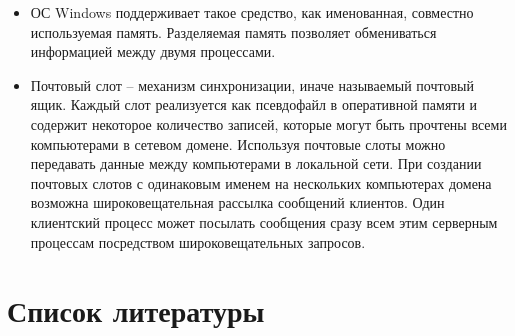 \documentclass[14pt,a4paper,report]{report}
\begin{document}
\begin{itemize}
	\item ОС Windows поддерживает такое средство, как именованная, совместно используемая память. Разделяемая память позволяет обмениваться информацией между двумя процессами.
	
	\item Почтовый слот – механизм синхронизации, иначе называемый почтовый ящик. Каждый слот реализуется как псевдофайл в оперативной памяти и содержит некоторое количество записей, которые могут быть прочтены всеми компьютерами в сетевом домене. Используя почтовые слоты можно передавать данные между компьютерами в локальной сети. При создании почтовых слотов с одинаковым именем на нескольких компьютерах домена возможна широковещательная рассылка сообщений клиентов. Один клиентский процесс может посылать сообщения сразу всем этим серверным процессам посредством широковещательных запросов.
\end{itemize}



\section{Список литературы}
\end{document}
